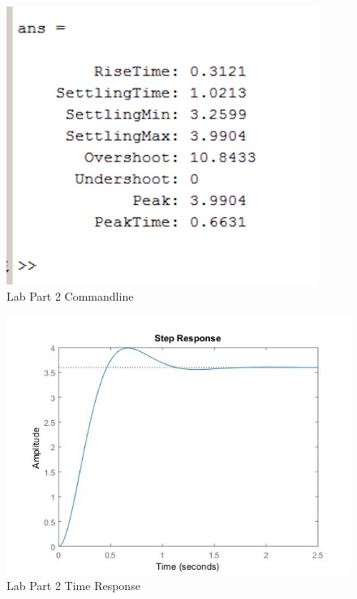 \documentclass[12pt]{article}
\begin{document}
\begin{figure}[h!] %
   \centering
   \includegraphics[width=4in]{part_2_commandline.jpg} 
   \caption{Lab Part 2 Commandline}
   \label{fig:example}
\end{figure}

\newpage

\begin{figure}[h!] %
   \centering
   \includegraphics[width=\linewidth]{part_2_time_response.jpg} 
   \caption{Lab Part 2 Time Response}
   \label{fig:example}
\end{figure}
\bigskip
\end{document}

